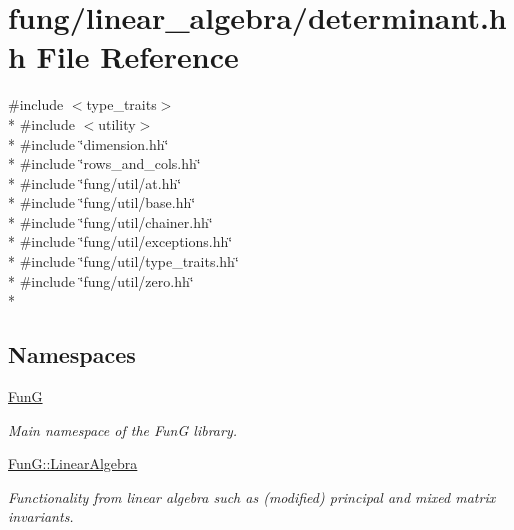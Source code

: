\hypertarget{determinant_8hh}{}\section{fung/linear\+\_\+algebra/determinant.hh File Reference}
\label{determinant_8hh}
{\ttfamily \#include $<$type\+\_\+traits$>$}\\*
{\ttfamily \#include $<$utility$>$}\\*
{\ttfamily \#include \char`\"{}dimension.\+hh\char`\"{}}\\*
{\ttfamily \#include \char`\"{}rows\+\_\+and\+\_\+cols.\+hh\char`\"{}}\\*
{\ttfamily \#include \char`\"{}fung/util/at.\+hh\char`\"{}}\\*
{\ttfamily \#include \char`\"{}fung/util/base.\+hh\char`\"{}}\\*
{\ttfamily \#include \char`\"{}fung/util/chainer.\+hh\char`\"{}}\\*
{\ttfamily \#include \char`\"{}fung/util/exceptions.\+hh\char`\"{}}\\*
{\ttfamily \#include \char`\"{}fung/util/type\+\_\+traits.\+hh\char`\"{}}\\*
{\ttfamily \#include \char`\"{}fung/util/zero.\+hh\char`\"{}}\\*
\subsection*{Namespaces}
\begin{DoxyCompactItemize}
\item 
 \hyperlink{namespaceFunG}{Fun\+G}
\begin{DoxyCompactList}\small\item\em Main namespace of the Fun\+G library. \end{DoxyCompactList}\item 
 \hyperlink{namespaceFunG_1_1LinearAlgebra}{Fun\+G\+::\+Linear\+Algebra}
\begin{DoxyCompactList}\small\item\em Functionality from linear algebra such as (modified) principal and mixed matrix invariants. \end{DoxyCompactList}\end{DoxyCompactItemize}
